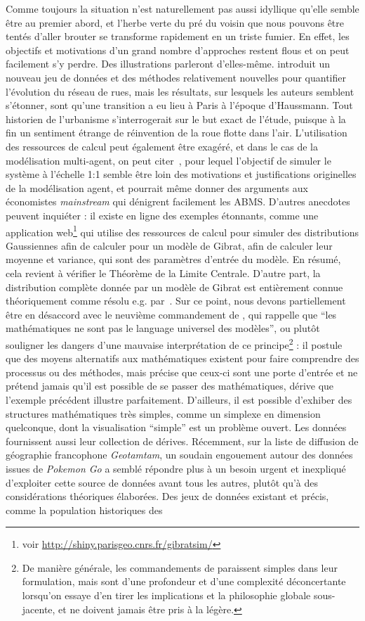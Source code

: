 {Comme toujours la situation n'est naturellement pas aussi idyllique qu'elle semble être au premier abord, et l'herbe verte du pré du voisin que nous pouvons être tentés d'aller brouter se transforme rapidement en un triste fumier. En effet, les objectifs et motivations d'un grand nombre d'approches restent flous et on peut facilement s'y perdre. Des illustrations parleront d'elles-même. \cite{barthelemy2013self} introduit un nouveau jeu de données et des méthodes relativement nouvelles pour quantifier l'évolution du réseau de rues, mais les résultats, sur lesquels les auteurs semblent s'étonner, sont qu'une transition a eu lieu à Paris à l'époque d'Haussmann. Tout historien de l'urbanisme s'interrogerait sur le but exact de l'étude, puisque à la fin un sentiment étrange de réinvention de la roue flotte dans l'air. L'utilisation des ressources de calcul peut également être exagéré, et dans le cas de la modélisation multi-agent, on peut citer~\cite{axtell2016120}, pour lequel l'objectif de simuler le système à l'échelle 1:1 semble être loin des motivations et justifications originelles de la modélisation agent, et pourrait même donner des arguments aux économistes \emph{mainstream} qui dénigrent facilement les ABMS. D'autres anecdotes peuvent inquiéter :  il existe en ligne des exemples étonnants, comme une application web\footnote{voir \url{http://shiny.parisgeo.cnrs.fr/gibratsim/}} qui utilise des ressources de calcul pour simuler des distributions Gaussiennes afin de calculer pour un modèle de Gibrat, afin de calculer leur moyenne et variance, qui sont des paramètres d'entrée du modèle. En résumé, cela revient à vérifier le Théorème de la Limite Centrale. D'autre part, la distribution complète donnée par un modèle de Gibrat est entièrement connue théoriquement comme résolu e.g. par~\cite{gabaix1999zipf}. Sur ce point, nous devons partiellement être en désaccord avec le neuvième commandement de , qui rappelle que ``les mathématiques ne sont pas le language universel des modèles'', ou plutôt souligner les dangers d'une mauvaise interprétation de ce principe\footnote{De manière générale, les commandements de  paraissent simples dans leur formulation, mais sont d'une profondeur et d'une complexité déconcertante lorsqu'on essaye d'en tirer les implications et la philosophie globale sous-jacente, et ne doivent jamais être pris à la légère.} : il postule que des moyens alternatifs aux mathématiques existent pour faire comprendre des processus ou des méthodes, mais précise que ceux-ci sont une porte d'entrée et ne prétend jamais qu'il est possible de se passer des mathématiques, dérive que l'exemple précédent illustre parfaitement. D'ailleurs, il est possible d'exhiber des structures mathématiques très simples, comme un simplexe en dimension quelconque, dont la visualisation ``simple'' est un problème ouvert. Les données fournissent aussi leur collection de dérives. Récemment, sur la liste de diffusion de géographie francophone \emph{Geotamtam}, un soudain engouement autour des données issues de \emph{Pokemon Go} a semblé répondre plus à un besoin urgent et inexpliqué d'exploiter cette source de données avant tous les autres, plutôt qu'à des considérations théoriques élaborées. Des jeux de données existant et précis, comme la population historiques des }
